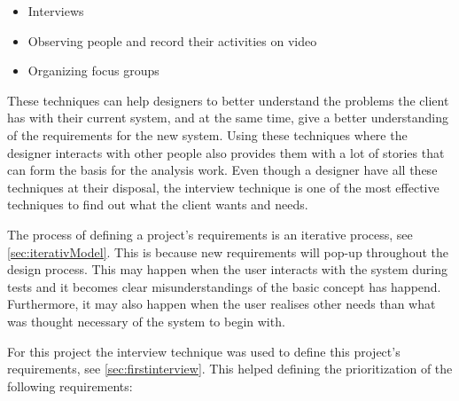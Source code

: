 \begin{itemize}
    \item Interviews
    \item Observing people and record their activities on video
    \item Organizing focus groups
\end{itemize}

These techniques can help designers to better understand the problems the client has with their current system, and at the same time, give a better understanding of the requirements for the new system.
Using these techniques where the designer interacts with other people also provides them with a lot of stories that can form the basis for the analysis work.
Even though a designer have all these techniques at their disposal, the interview technique
is one of the most effective techniques to find out what the client wants and needs.

The process of defining a project's requirements is an iterative process, see \cref{sec:iterativModel}.
This is because new requirements will pop-up throughout the design process.
This may happen when the user interacts with the system during tests and it becomes clear misunderstandings of the basic concept has happend.
Furthermore, it may also happen when the user realises other needs than what was thought necessary of the system to begin with.

For this project the interview technique was used to define this project's requirements, see \cref{sec:firstinterview}. This helped defining the prioritization of the following requirements:

